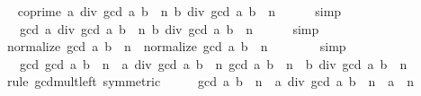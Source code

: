 \begin{isabellebody}
\ \isamarkupfalse%
\ {\isachardoublequoteopen}coprime\ {\isacharparenleft}{\kern0pt}{\isacharparenleft}{\kern0pt}a\ div\ gcd\ a\ b{\isacharparenright}{\kern0pt}\ {\isacharcircum}{\kern0pt}\ n{\isacharparenright}{\kern0pt}\ {\isacharparenleft}{\kern0pt}{\isacharparenleft}{\kern0pt}b\ div\ gcd\ a\ b{\isacharparenright}{\kern0pt}\ {\isacharcircum}{\kern0pt}\ n{\isacharparenright}{\kern0pt}{\isachardoublequoteclose}\isanewline
\ \ \ \ \isamarkupfalse%
\ simp\isanewline
\ \ \isamarkupfalse%
\ \isamarkupfalse%
\ {\isachardoublequoteopen}{}\ {\isacharequal}{\kern0pt}\ gcd\ {\isacharparenleft}{\kern0pt}{\isacharparenleft}{\kern0pt}a\ div\ gcd\ a\ b{\isacharparenright}{\kern0pt}\ {\isacharcircum}{\kern0pt}\ n{\isacharparenright}{\kern0pt}\ {\isacharparenleft}{\kern0pt}{\isacharparenleft}{\kern0pt}b\ div\ gcd\ a\ b{\isacharparenright}{\kern0pt}\ {\isacharcircum}{\kern0pt}\ n{\isacharparenright}{\kern0pt}{\isachardoublequoteclose}\isanewline
\ \ \ \ \isamarkupfalse%
\ simp\isanewline
\ \ \isamarkupfalse%
\ \isamarkupfalse%
\ {\isachardoublequoteopen}normalize\ {\isacharparenleft}{\kern0pt}gcd\ a\ b\ {\isacharcircum}{\kern0pt}\ n{\isacharparenright}{\kern0pt}\ {\isacharequal}{\kern0pt}\ normalize\ {\isacharparenleft}{\kern0pt}gcd\ a\ b\ {\isacharcircum}{\kern0pt}\ n\ {\isacharasterisk}{\kern0pt}\ {\isasymdots}{\isacharparenright}{\kern0pt}{\isachardoublequoteclose}\isanewline
\ \ \ \ \isamarkupfalse%
\ simp\isanewline
\ \ \isamarkupfalse%
\ \isamarkupfalse%
\ {\isachardoublequoteopen}{\isasymdots}\ {\isacharequal}{\kern0pt}\ gcd\ {\isacharparenleft}{\kern0pt}gcd\ a\ b\ {\isacharcircum}{\kern0pt}\ n\ {\isacharasterisk}{\kern0pt}\ {\isacharparenleft}{\kern0pt}a\ div\ gcd\ a\ b{\isacharparenright}{\kern0pt}\ {\isacharcircum}{\kern0pt}\ n{\isacharparenright}{\kern0pt}\ {\isacharparenleft}{\kern0pt}gcd\ a\ b\ {\isacharcircum}{\kern0pt}\ n\ {\isacharasterisk}{\kern0pt}\ {\isacharparenleft}{\kern0pt}b\ div\ gcd\ a\ b{\isacharparenright}{\kern0pt}\ {\isacharcircum}{\kern0pt}\ n{\isacharparenright}{\kern0pt}{\isachardoublequoteclose}\isanewline
\ \ \ \ \isamarkupfalse%
\ {\isacharparenleft}{\kern0pt}rule\ gcd{\isacharunderscore}{\kern0pt}mult{\isacharunderscore}{\kern0pt}left\ {\isacharbrackleft}{\kern0pt}symmetric{\isacharbrackright}{\kern0pt}{\isacharparenright}{\kern0pt}\isanewline
\ \ \isamarkupfalse%
\ \isamarkupfalse%
\ {\isachardoublequoteopen}{\isacharparenleft}{\kern0pt}gcd\ a\ b{\isacharparenright}{\kern0pt}\ {\isacharcircum}{\kern0pt}\ n\ {\isacharasterisk}{\kern0pt}\ {\isacharparenleft}{\kern0pt}a\ div\ gcd\ a\ b{\isacharparenright}{\kern0pt}\ {\isacharcircum}{\kern0pt}\ n\ {\isacharequal}{\kern0pt}\ a\ {\isacharcircum}{\kern0pt}\ n{\isachardoublequoteclose}\isanewline

\end{isabellebody}
